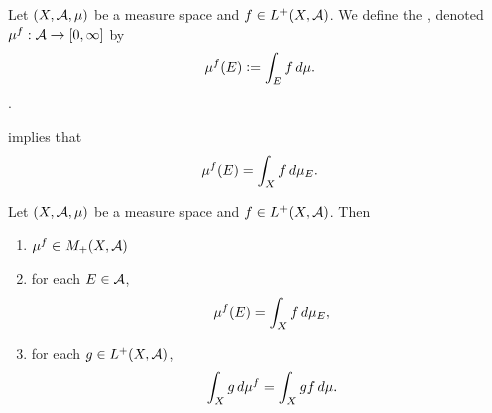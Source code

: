 \documentclass{book}
\begin{document}
	\begin{defn}  
		Let $(X, \mathcal{A}, \mu)$ be a measure space and $f \in L^+(X, \mathcal{A})$. We define the , denoted $\mu^f: \mathcal{A} \rightarrow [0,\infty]$ by 
		$$\mu^f(E) \vcentcolon= \int_E f \, d \mu.$$
		 . 
	\end{defn}

	\begin{note}
		 implies that 
		$$\mu^f(E) = \int_X f \, d \mu_E.$$
	\end{note}
	
	\begin{ex}  
		Let $(X, \mathcal{A}, \mu)$ be a measure space and $f \in L^+(X, \mathcal{A})$. Then 
		\begin{enumerate}
			\item $\mu^f \in M_+(X, \mathcal{A})$
			\item for each $E \in \mathcal{A}$, 
			$$\mu^f(E) = \int_X f \, d \mu_E, $$
			\item for each $g \in L^+(X, \mathcal{A})$, 
			$$\int_X g \, d \mu^f = \int_X g f \, d \mu. $$
		\end{enumerate}
	\end{ex}
	
\end{document}
